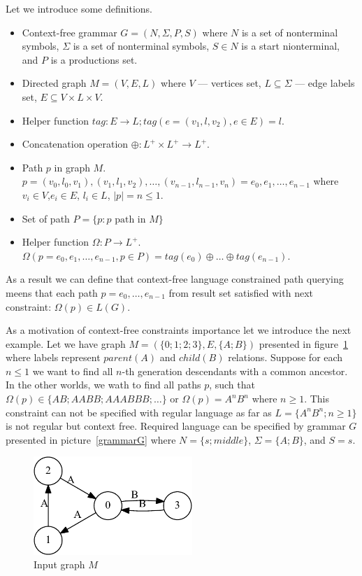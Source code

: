 \documentclass{sig-alternate} %
\begin{document}
Let we introduce some definitions.
\begin{itemize}
  \item Context-free grammar $G=(N, \Sigma, P, S)$ where $N$ is a set of nonterminal symbols, $\Sigma$ is a set of nonterminal symbols, $S \in N$ is a start nionterminal, and $P$ is a productions set. 
  \item Directed graph $M = (V,E,L)$ where $V$ --- vertices set, $L \subseteq \Sigma$ --- edge labels set, $E\subseteq V\times L\times V$.
  \item Helper function $tag: E \rightarrow L; tag(e = (v_1,l,v_2), e \in E) = l$.
  \item Concatenation operation $\oplus: L^+ \times L^+ \rightarrow L^+$.
  \item Path $p$ in graph $M$. \\ $p = (v_0,l_0,v_1),(v_1,l_1,v_2),\dots,(v_{n-1},l_{n-1},v_n) = e_0,e_1,\dots,e_{n-1}$ where $v_i \in V$,$e_i \in E$, $l_i \in L$, $|p| = n \leq 1$. 
  \item Set of path $P = \{p: p \text{ path in } M\}$
  \item Helper function $\Omega: P \rightarrow L^+$.\\ $\Omega(p = e_0,e_1,\dots,e_{n-1}, p \in P) = tag (e_0) \oplus \dots \oplus tag (e_{n-1})$.
\end{itemize}

As a result we can define that context-free language constrained path querying meens that each path $p = e_0,\dots,e_{n-1}$ from result set satisfied with next constraint: $\Omega(p) \in L(G)$. 

As a motivation of context-free constraints importance let we introduce the next example.
Let we have graph $M=(\{0;1;2;3\},E,\{A;B\})$ presented in figure~\ref{input} where labels represent $parent (A)$ and $child (B)$ relations. 
Suppose for each $n \leq 1$ we want to find all $n$-th generation descendants with a common ancestor.
In the other worlds, we wath to find all paths $p$, such that $\Omega(p) \in \{AB; AABB; AAABBB; \dots\}$ or $\Omega(p) = A^n B^n$ where $n \geq 1$.
This constraint can not be specified with regular language as far as $L=\{A^n B^n; n \geq 1\}$ is not regular but context free.
Required language can be specified by grammar $G$ presented in picture~\ref{grammarG} where $N = \{s; middle\}$, $\Sigma = \{A; B\}$, and $S = s$.

\begin{figure}[h]
    \begin{center}
        \includegraphics[width=6cm]{dot/input.pdf}
        \caption{Input graph $M$}
        \label{input}        
    \end{center}
\end{figure}
\end{document}
